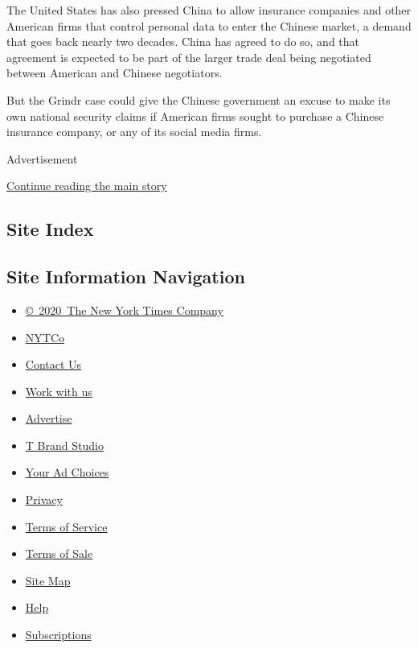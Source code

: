 The United States has also pressed China to allow insurance companies
and other American firms that control personal data to enter the Chinese
market, a demand that goes back nearly two decades. China has agreed to
do so, and that agreement is expected to be part of the larger trade
deal being negotiated between American and Chinese negotiators.

But the Grindr case could give the Chinese government an excuse to make
its own national security claims if American firms sought to purchase a
Chinese insurance company, or any of its social media firms.

Advertisement

\protect\hyperlink{after-bottom}{Continue reading the main story}

\hypertarget{site-index}{%
\subsection{Site Index}\label{site-index}}

\hypertarget{site-information-navigation}{%
\subsection{Site Information
Navigation}\label{site-information-navigation}}

\begin{itemize}
\tightlist
\item
  \href{https://help.nytimes.com/hc/en-us/articles/115014792127-Copyright-notice}{©~2020~The
  New York Times Company}
\end{itemize}

\begin{itemize}
\tightlist
\item
  \href{https://www.nytco.com/}{NYTCo}
\item
  \href{https://help.nytimes.com/hc/en-us/articles/115015385887-Contact-Us}{Contact
  Us}
\item
  \href{https://www.nytco.com/careers/}{Work with us}
\item
  \href{https://nytmediakit.com/}{Advertise}
\item
  \href{http://www.tbrandstudio.com/}{T Brand Studio}
\item
  \href{https://www.nytimes.com/privacy/cookie-policy\#how-do-i-manage-trackers}{Your
  Ad Choices}
\item
  \href{https://www.nytimes.com/privacy}{Privacy}
\item
  \href{https://help.nytimes.com/hc/en-us/articles/115014893428-Terms-of-service}{Terms
  of Service}
\item
  \href{https://help.nytimes.com/hc/en-us/articles/115014893968-Terms-of-sale}{Terms
  of Sale}
\item
  \href{https://spiderbites.nytimes.com}{Site Map}
\item
  \href{https://help.nytimes.com/hc/en-us}{Help}
\item
  \href{https://www.nytimes.com/subscription?campaignId=37WXW}{Subscriptions}
\end{itemize}
